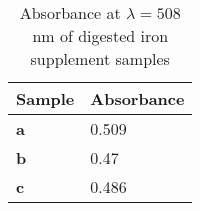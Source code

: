 \begin{table}[H]
    \centering
    \begin{tabular}{l|l}
\rowcolor[HTML]{FFC8F0} 
\textbf{Sample} & \textbf{Absorbance} \\ \hline
\rowcolor[HTML]{FFE6F8} 
\textbf{a}      & 0.509               \\
\rowcolor[HTML]{FFE6F8} 
\textbf{b}      & 0.47                \\
\rowcolor[HTML]{FFE6F8} 
\textbf{c}      & 0.486              
\end{tabular}
    \caption{Absorbance at $\lambda = 508$ nm of digested iron supplement samples}
    \label{tab:sample_abs}
\end{table}